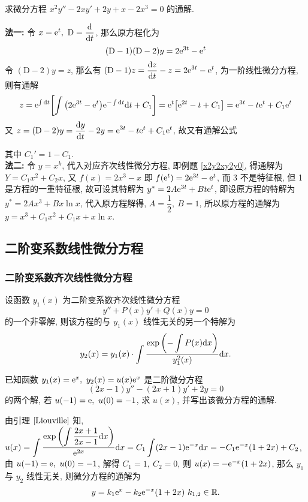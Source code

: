 \begin{example}
    求微分方程 $x^2y''-2xy'+2y+x-2x^3=0$ 的通解.
\end{example}
\begin{solution}
    \textbf{法一: }令 $x=\mathrm{e} ^t,~\mathrm{D}=\displaystyle\dv{t}$, 那么原方程化为
    $$(\mathrm{D}-1)(\mathrm{D}-2)y=2\mathrm{e} ^{3t}-\mathrm{e} ^t$$
    令 $(\mathrm{D}-2)y=z$, 那么有 $(\mathrm{D}-1)z=\displaystyle\dv{z}{t}-z=2\mathrm{e} ^{3t}-\mathrm{e} ^t$, 为一阶线性微分方程, 则有通解
    $$z=\mathrm{e} ^{\int\dd t}\qty[\int\qty(2\mathrm{e} ^{3t}-\mathrm{e} ^t)\mathrm{e} ^{-\int\dd t}\dd t+C_1]=\mathrm{e} ^t\qty[\mathrm{e} ^{2t}-t+C_1]=\mathrm{e} ^{3t}-t\mathrm{e} ^{t}+C_1\mathrm{e} ^t$$
    又 $z=(\mathrm{D}-2)y=\displaystyle\dv{y}{t}-2y=\mathrm{e} ^{3t}-t\mathrm{e} ^{t}+C_1\mathrm{e} ^t$, 故又有通解公式
    其中 $C_1'=1-C_1.$\\
    \textbf{法二: }令 $y=x^k$, 代入对应齐次线性微分方程, 即例题 \ref{x2y2xy2y0}, 得通解为 $Y=C_1x^2+C_2x$,
    又 $f(x)=2x^3-x$ 即 $f\qty(\mathrm{e} ^t)=2\mathrm{e} ^{3t}-\mathrm{e} ^t$, 而 3 不是特征根, 但 1 是方程的一重特征根,
    故可设其特解为 $y^*=2A\mathrm{e} ^{3t}+Bt\mathrm{e} ^t$,
    即设原方程的特解为 $y^*=2Ax^3+Bx\ln x$, 代入原方程解得, $A=\dfrac{1}{2},~B=1$, 所以原方程的通解为
    $y=x^3+C_1x^2+C_1x+x\ln x.$
\end{solution}

\subsection{二阶变系数线性微分方程}

\subsubsection{二阶变系数齐次线性微分方程}

\begin{lemma}[Liouville 引理]
    \label{Liouville}设函数 $y_1(x)$ 为二阶变系数齐次线性微分方程 $$y''+P(x)y'+Q(x)y=0$$
    的一个非零解, 则该方程的与 $y_1(x)$ 线性无关的另一个特解为
    $$y_2(x)=y_1(x)\cdot\int\dfrac{\exp\qty(-\displaystyle\int P(x)\dd x)}{y_1^2(x)}\dd x.$$
\end{lemma}

\begin{example}[2016 数二]
    已知函数 $y_1(x)=\mathrm{e} ^x,~y_2(x)=u(x)\mathrm{e} ^x$ 是二阶微分方程 $$(2x-1)y''-(2x+1)y'+2y=0$$ 的两个解,
    若 $u(-1)=\mathrm{e} ,~u(0)=-1$, 求 $u(x)$, 并写出该微分方程的通解.
\end{example}
\begin{solution}
    由引理 $\ref{Liouville}$ 知, $u(x)=\displaystyle\int\dfrac{\exp\qty(\displaystyle\int\dfrac{2x+1}{2x-1}\dd x)}{\mathrm{e} ^{2x}}\dd x=C_1\int(2x-1)\mathrm{e} ^{-x}\dd x=-C_1\mathrm{e} ^{-x}(1+2x)+C_2$,
    由 $u(-1)=\mathrm{e} ,~u(0)=-1$, 解得 $C_1=1,~C_2=0$, 则 $u(x)=-\mathrm{e} ^{-x}(1+2x)$, 那么 $y_1$ 与 $y_2$ 线性无关, 则微分方程的通解为
    $$y=k_1\mathrm{e} ^x-k_2\mathrm{e} ^{-x}(1+2x)~  k_{1,2}\in\mathbb{R}.$$
\end{solution}

